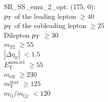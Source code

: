 SR\_SS\_emu\_2\_opt: (175, 0): \\
$p_{\text{T}}$ of the leading lepton $\geq 40$ \\
$p_{\text{T}}$ of the subleading lepton $\geq 25$ \\
Dilepton $p_{\text{T}}$ $\geq 30$ \\
$m_{T2}$ $\geq 55$ \\
$|\Delta\eta_{ll}|$ $<1.5$ \\
$E_{\text{T}}^{\text{miss,rel}}$ $\geq 55$ \\
$m_{\text{eff}}$ $\geq 230$ \\
$m_{\text{T}}^{\text{max}}$ $\geq 125$ \\
$m_{lj}$/$m_{ljj}$ $<120$ \\
